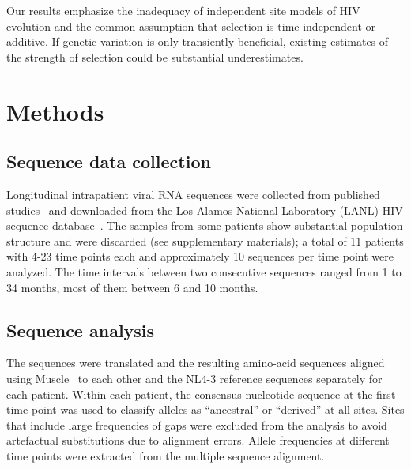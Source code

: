 \documentclass[rmp, twocolumn]{revtex4}
\begin{document}
Our results emphasize the inadequacy of independent site models of HIV evolution
and the common assumption that selection is time independent or additive. If
genetic variation is only transiently beneficial, existing estimates of the
strength of selection \citep{neher_recombination_2010,batorsky_estimate_2011} could be
substantial underestimates.

\section{Methods}
\subsection{Sequence data collection}
Longitudinal intrapatient viral RNA sequences were collected from published
studies~\citep{shankarappa_consistent_1999, liu_selection_2006,
bunnik_autologous_2008} and downloaded from the Los Alamos National Laboratory
(LANL) HIV sequence database~\citep{LANL2012}. The samples from some patients
show substantial population structure and were discarded (see supplementary
materials); a total of 11 patients with 4-23 time points each and approximately 10
sequences per time point were analyzed. The time intervals between two
consecutive sequences ranged from 1 to 34 months, most of them between 6 and 10
months.

\subsection{Sequence analysis}
The sequences were translated and the resulting amino-acid sequences aligned
using Muscle~\citep{edgar_muscle:_2004} to each other and the NL4-3 reference
sequences separately for each patient. Within each patient, the consensus
nucleotide sequence at the first time point was used to classify alleles as
``ancestral'' or ``derived'' at all sites. Sites that include large
frequencies of gaps were excluded from the analysis to avoid artefactual
substitutions due to alignment errors. Allele frequencies at different time
points were extracted from the multiple sequence alignment.
\end{document}
